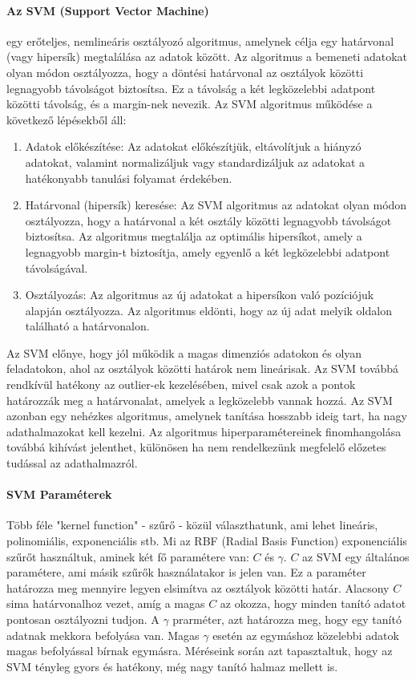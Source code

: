 \documentclass[acmtog, authorversion]{acmart}
\begin{document}
\paragraph{Az SVM (Support Vector Machine)} egy erőteljes, nemlineáris osztályozó algoritmus, amelynek célja egy határvonal (vagy hipersík) megtalálása az adatok között. Az algoritmus a bemeneti adatokat olyan módon osztályozza, hogy a döntési határvonal az osztályok közötti legnagyobb távolságot biztosítsa. Ez a távolság a két legközelebbi adatpont közötti távolság, és a margin-nek nevezik.
Az SVM algoritmus működése a következő lépésekből áll:
\begin{enumerate}
    \item Adatok előkészítése: Az adatokat előkészítjük, eltávolítjuk a hiányzó adatokat, valamint normalizáljuk vagy standardizáljuk az adatokat a hatékonyabb tanulási folyamat érdekében.
    \item Határvonal (hipersík) keresése: Az SVM algoritmus az adatokat olyan módon osztályozza, hogy a határvonal a két osztály közötti legnagyobb távolságot biztosítsa. Az algoritmus megtalálja az optimális hipersíkot, amely a legnagyobb margin-t biztosítja, amely egyenlő a két legközelebbi adatpont távolságával.
    \item Osztályozás: Az algoritmus az új adatokat a hipersíkon való pozíciójuk alapján osztályozza. Az algoritmus eldönti, hogy az új adat melyik oldalon található a határvonalon.
\end{enumerate}
Az SVM előnye, hogy jól működik a magas dimenziós adatokon és olyan feladatokon, ahol az osztályok közötti határok nem lineárisak. Az SVM továbbá rendkívül hatékony az outlier-ek kezelésében, mivel csak azok a pontok határozzák meg a határvonalat, amelyek a legközelebb vannak hozzá. Az SVM azonban egy nehézkes algoritmus, amelynek tanítása hosszabb ideig tart, ha nagy adathalmazokat kell kezelni. Az algoritmus hiperparamétereinek finomhangolása továbbá kihívást jelenthet, különösen ha nem rendelkezünk megfelelő előzetes tudással az adathalmazról.
\paragraph{SVM Paraméterek} Több féle "kernel function" - szűrő - közül választhatunk, ami lehet lineáris, polinomiális, exponenciális stb. Mi az RBF (Radial Basis Function) exponenciális szűrőt használtuk, aminek két fő paramétere van: $C$ és $\gamma$. $C$ az SVM egy általános paramétere, ami másik szűrők használatakor is jelen van. Ez a paraméter határozza meg mennyire legyen elsimítva az osztályok közötti határ. Alacsony $C$ sima határvonalhoz vezet, amíg a magas $C$ az okozza, hogy minden tanító adatot pontosan osztályozni tudjon. A $\gamma$ prarméter, azt határozza meg, hogy egy tanító adatnak mekkora befolyása van. Magas $\gamma$ esetén az egymáshoz közelebbi adatok magas befolyással bírnak egymásra. Méréseink során azt tapasztaltuk, hogy az SVM tényleg gyors és hatékony, még nagy tanító halmaz mellett is.
\end{document}

